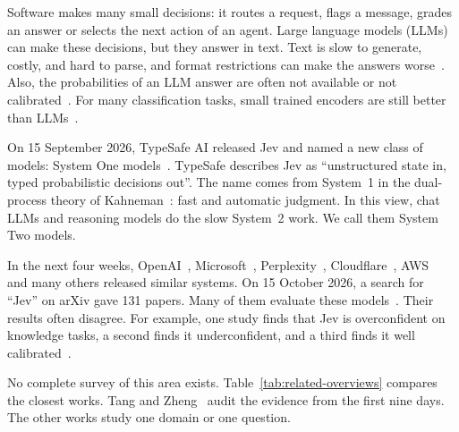 \documentclass[acmsmall,nonacm,screen]{acmart}
\newcommand{\sones}{System One models\xspace}
\newcommand{\stwos}{System Two models\xspace}
\begin{document}
Software makes many small decisions: it routes a request, flags a message, grades an answer or selects the next action of an agent. Large language models (LLMs) can make these decisions, but they answer in text. Text is slow to generate, costly, and hard to parse, and format restrictions can make the answers worse~\cite{tam2024let}. Also, the probabilities of an LLM answer are often not available or not calibrated~\cite{geng2023survey,liu2025uncertainty}. For many classification tasks, small trained encoders are still better than LLMs~\cite{zhang2025bertlike}.

On 15 September 2026, TypeSafe AI released Jev and named a new class of models: \sones~\cite{typesafe2026introducing}. TypeSafe describes Jev as ``unstructured state in, typed probabilistic decisions out''. The name comes from System~1 in the dual-process theory of Kahneman~\cite{kahneman2011thinking}: fast and automatic judgment. In this view, chat LLMs and reasoning models do the slow System~2 work. We call them \stwos.

In the next four weeks, OpenAI~\cite{openai2026decisions}, Microsoft~\cite{microsoft2026decision1}, Perplexity~\cite{perplexity2026decider}, Cloudflare~\cite{cloudflare2026clef}, AWS~\cite{aws2026strands} and many others released similar systems. On 15 October 2026, a search for ``Jev'' on arXiv gave 131 papers. Many of them evaluate these models~\cite{deusser2026evaluating,rafe2026benchmarking,geuter2026releasing,rao2026decision,sharma2026typedbench,xu2026jevout,duan2026general}. Their results often disagree. For example, one study finds that Jev is overconfident on knowledge tasks, a second finds it underconfident, and a third finds it well calibrated~\cite{artificialanalysis2026decision,sharma2026typedbench,deusser2026evaluating}.

No complete survey of this area exists. Table~\ref{tab:related-overviews} compares the closest works. Tang and Zheng~\cite{tang2026typed} audit the evidence from the first nine days. The other works study one domain or one question.
\end{document}

